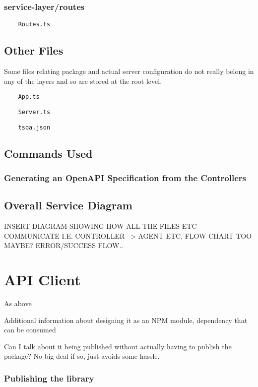 \subsubsection{service-layer/routes}
\begin{verbatim}
    Routes.ts
\end{verbatim}
\subsection{Other Files}
Some files relating package and actual server configuration do not really belong in any of the layers and so are stored at the root level.
\begin{verbatim}
    App.ts
\end{verbatim}
\begin{verbatim}
    Server.ts
\end{verbatim}
\begin{verbatim}
    tsoa.json
\end{verbatim}
\subsection{Commands Used}
\subsubsection{Generating an OpenAPI Specification from the Controllers}


\subsection{Overall Service Diagram}
INSERT DIAGRAM SHOWING HOW ALL THE FILES ETC COMMUNICATE I.E. CONTROLLER --> AGENT ETC, FLOW CHART TOO MAYBE? ERROR/SUCCESS FLOW..

\section{API Client}
As above

Additional information about designing it as an NPM module, dependency that can be consumed 

Can I talk about it being published without actually having to publish the package? No big deal if so, just avoids some hassle.

\subsubsection{Publishing the library}

